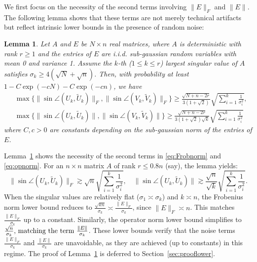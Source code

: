 \documentclass[reqno]{amsart}
\theoremstyle{plain}
\newtheorem{lemma}[theorem]{Lemma}
\theoremstyle{definition}
\begin{document}
We first focus on the necessity of the second terms involving $\|E\|_F$ and $\|E\|$. The following lemma shows that these terms are not merely technical artifacts but reflect intrinsic lower bounds in the presence of random noise:
\begin{lemma}\label{lem:lowerbdFO}
Let $A$ and $E$ be $N\times n$ real matrices, where $A$ is deterministic with rank $r\ge 1$ and the entries of $E$ are i.i.d. sub-gaussian random variables with mean 0 and variance 1. Assume the $k$-th ($1\le k \le r$) largest singular value of $A$ satisfies $\sigma_k \ge 4(\sqrt N+ \sqrt n)$. Then, with probability at least $1 - C\exp(-cN) - C\exp(-cn)$, we have  
\begin{align}
&\max\{ \|\sin \angle ( U_{k}, \widetilde{ U}_{k})\|_F, \|\sin \angle ( V_{k}, \widetilde{ V}_{k})\|_F\} \ge \frac{ \sqrt{N+n-2r}}{3(1+\sqrt 2)} \sqrt{\sum_{i=1}^k \frac{1}{\sigma_i^2}},\label{eq:lowerbd-F}\\
&\max\{\|\sin \angle ( U_{k}, \widetilde{ U}_{k})\|, \|\sin \angle ( V_{k}, \widetilde{ V}_{k})\| \} \ge \frac{ \sqrt{N+n-2r}}{3(1+\sqrt 2)\sqrt{k}} \sqrt{\sum_{i=1}^k \frac{1}{\sigma_i^2}}\label{eq:lowerbd-O}
\end{align}
where $C,c>0$ are constants depending on the sub-gaussian norm of the entries of $E$.
\end{lemma}
Lemma~\ref{lem:lowerbdFO} shows the necessity of the second terms in \eqref{eq:Frobnorm} and \eqref{eq:opnorm}. For an \(n \times n\) matrix \(A\) of rank \(r \leq 0.8n\) (say), the lemma yields:
\[
\|\sin \angle (U_k, \widetilde{U}_k)\|_F \gtrsim \sqrt{n} \sqrt{\sum_{i=1}^k \frac{1}{\sigma_i^2}}, \quad \|\sin \angle (U_k, \widetilde{U}_k)\| \gtrsim \frac{\sqrt{n}}{\sqrt{k}} \sqrt{\sum_{i=1}^k \frac{1}{\sigma_i^2}}.
\]
When the singular values are relatively flat (\(\sigma_1 \asymp \sigma_k\)) and \(k \asymp n\), the Frobenius norm lower bound reduces to \(\frac{ \sqrt{k n}}{\sigma_k} \asymp \frac{\|E\|_F}{\sigma_k}\), since \(\|E\|_F\asymp n\). This matches \(\frac{\|E\|_F}{\sigma_k}\) up to a constant. Similarly, the operator norm lower bound simplifies to \(\frac{\sqrt{n}}{\sigma_k}$, matching the term $\frac{\|E\|}{\sigma_k}\). These lower bounds verify that the noise terms \(\frac{\|E\|_F}{\sigma_k}\) and \(\frac{\|E\|}{\sigma_k}\) are unavoidable, as they are achieved (up to constants) in this regime. The proof of Lemma~\ref{lem:lowerbdFO} is deferred to Section~\ref{sec:prooflower}.
\end{document}
